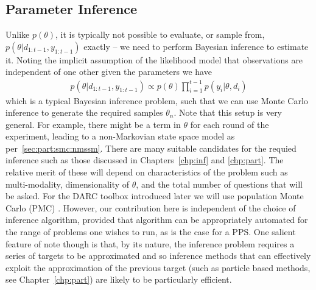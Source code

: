 \subsection{Parameter Inference}
\label{sec:design:auto:inf}

Unlike $p\left(\theta\right)$, it is typically not possible to evaluate, or sample from, $p\left(\theta | d_{1:t-1}, y_{1:t-1}\right)$ exactly -- we need to perform Bayesian inference to estimate it.  Noting
the implicit assumption of the likelihood model that observations are independent of one other given the
parameters we have
\begin{align}
p\left(\theta | d_{1:t-1}, y_{1:t-1}\right) \propto p(\theta) \prod_{i=1}^{t-1} p(y_i | \theta, d_i)
\end{align}
which is a typical Bayesian inference problem, such that we can use Monte Carlo inference
to generate the required samples $\theta_n$.  Note that this setup is very general.   For example, there might
be a term in $\theta$ for each round of the experiment, leading to a non-Markovian state space model as
per~\ref{sec:part:smc:nmssm}.
There are many suitable candidates for the requied inference such as those discussed in Chapters~\ref{chp:inf} and
\ref{chp:part}.
The relative merit of these will depend on
characteristics of the problem such as multi-modality, dimensionality of $\theta$, and the total
number of questions that will be asked.  For the DARC toolbox introduced later we will use 
population Monte Carlo (PMC) \citep{cappe2004population}.  However, our contribution here is independent of
the choice of inference algorithm, provided that algorithm can be appropriately automated for the range
of problems one wishes to run, as is the case for a PPS.  One salient feature of note though is
that, by its nature, the inference problem requires a series of targets to be approximated and so
inference methods that can effectively exploit the approximation of the previous target (such as particle
based methods, see Chapter~\ref{chp:part}) are likely to be particularly efficient.


